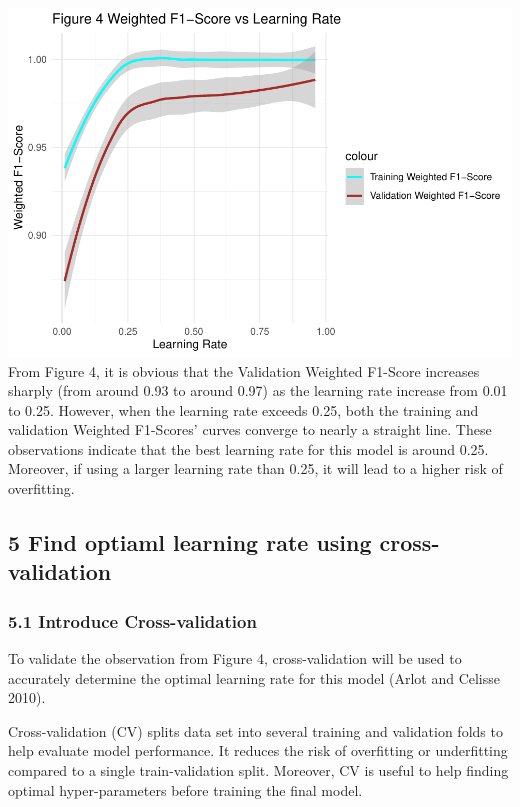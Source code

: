 \documentclass[
]{article}
\begin{document}
\includegraphics{Code_C_files/figure-latex/plot for different learning rate-1.pdf}
From Figure 4, it is obvious that the Validation Weighted F1-Score
increases sharply (from around 0.93 to around 0.97) as the learning rate
increase from 0.01 to 0.25. However, when the learning rate exceeds
0.25, both the training and validation Weighted F1-Scores' curves
converge to nearly a straight line. These observations indicate that the
best learning rate for this model is around 0.25. Moreover, if using a
larger learning rate than 0.25, it will lead to a higher risk of
overfitting.

\subsection{5 Find optiaml learning rate using
cross-validation}\label{find-optiaml-learning-rate-using-cross-validation}

\subsubsection{5.1 Introduce
Cross-validation}\label{introduce-cross-validation}

To validate the observation from Figure 4, cross-validation will be used
to accurately determine the optimal learning rate for this model (Arlot
and Celisse 2010).

Cross-validation (CV) splits data set into several training and
validation folds to help evaluate model performance. It reduces the risk
of overfitting or underfitting compared to a single train-validation
split. Moreover, CV is useful to help finding optimal hyper-parameters
before training the final model.
\end{document}
